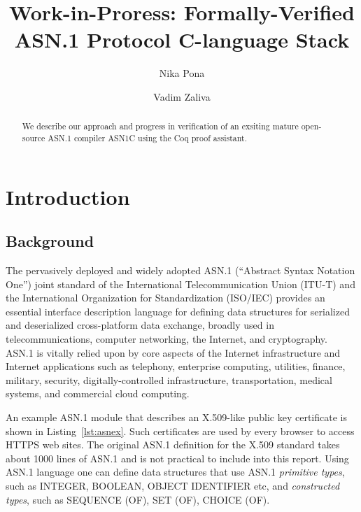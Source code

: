 \documentclass[acmsmall,nonacm]{acmart}
\begin{document}
\title{Work-in-Proress: Formally-Verified ASN.1 Protocol C-language Stack}

\author{Nika Pona}
\author{Vadim Zaliva}

\begin{abstract}
We describe our approach and progress in verification of an exsiting mature open-source ASN.1 compiler ASN1C using the Coq proof assistant. 
\end{abstract}

\maketitle

\tableofcontents

\section{Introduction}

\subsection{Background}

The pervasively deployed and widely adopted ASN.1 (``Abstract Syntax
Notation One'') \cite{ASN1Intro} joint standard of the International
Telecommunication Union (ITU-T) and the International Organization for
Standardization (ISO/IEC) provides an essential interface description
language for defining data structures for serialized and deserialized
cross-platform data exchange, broadly used in telecommunications,
computer networking, the Internet, and cryptography. ASN.1 is
vitally relied upon by core aspects of the Internet infrastructure and
Internet applications such as telephony, enterprise computing,
utilities, finance, military, security, digitally-controlled
infrastructure, transportation, medical systems, and commercial cloud
computing.

An example ASN.1 module that describes an X.509-like public key certificate
is shown in Listing~\ref{lst:asnex}.
Such certificates are used by every browser to access HTTPS web sites.
The original ASN.1 definition for the X.509 standard takes about 1000 lines
of ASN.1 and is not practical to include into this report. Using ASN.1 language one can define data structures that use ASN.1 {\it primitive types}, such as INTEGER, BOOLEAN, OBJECT IDENTIFIER etc, and {\it constructed types}, such as SEQUENCE (OF), SET (OF), CHOICE (OF).
\end{document}
